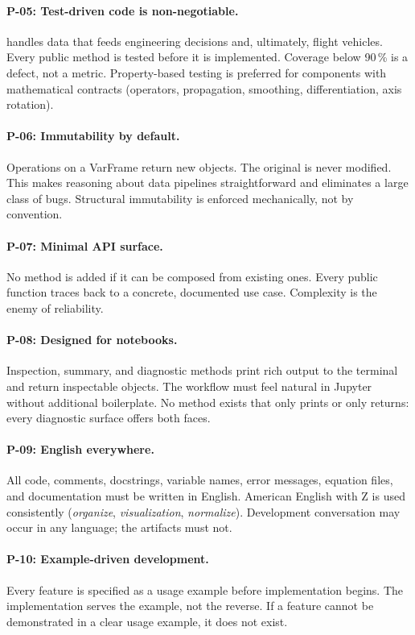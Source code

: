 \paragraph{P-05: Test-driven code is non-negotiable.}
\itc{} handles data that feeds engineering decisions and, ultimately, flight
vehicles. Every public method is tested before it is implemented. Coverage
below 90\,\% is a defect, not a metric. Property-based testing is preferred
for components with mathematical contracts (operators, propagation,
smoothing, differentiation, axis rotation).

\paragraph{P-06: Immutability by default.}
Operations on a VarFrame return new objects. The original is never modified.
This makes reasoning about data pipelines straightforward and eliminates a
large class of bugs. Structural immutability is enforced mechanically, not by
convention.

\paragraph{P-07: Minimal API surface.}
No method is added if it can be composed from existing ones. Every public
function traces back to a concrete, documented use case. Complexity is the
enemy of reliability.

\paragraph{P-08: Designed for notebooks.}
Inspection, summary, and diagnostic methods print rich output to the terminal
and return inspectable objects. The workflow must feel natural in Jupyter
without additional boilerplate. No method exists that only prints or only
returns: every diagnostic surface offers both faces.

\paragraph{P-09: English everywhere.}
All code, comments, docstrings, variable names, error messages, equation
files, and documentation must be written in English. American English with
Z is used consistently (\emph{organize}, \emph{visualization},
\emph{normalize}). Development conversation may occur in any language; the
artifacts must not.

\paragraph{P-10: Example-driven development.}
Every feature is specified as a usage example before implementation begins.
The implementation serves the example, not the reverse. If a feature cannot
be demonstrated in a clear usage example, it does not exist.

